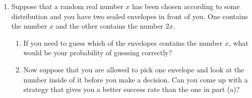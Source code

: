 \documentclass[11pt,letterpaper]{report}
\begin{document}
\begin{enumerate}
	\item Suppose that a random real number $x$ has been chosen according to some distribution and you have two sealed envelopes in front of you. One contains the number $x$ and the other contains the number $2x$.
	\begin{enumerate}
		\item If you need to guess which of the envelopes contains the number $x$, what would be your probability of guessing correctly?

		\item Now suppose that you are allowed to pick one envelope and look at the number inside of it before you make a decision. Can you come up with a strategy that gives you a better success rate than the one in part (a)?
	\end{enumerate}
\end{enumerate}
\end{document}
